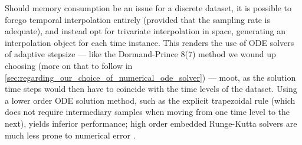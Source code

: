 Should memory consumption be an issue for a discrete dataset, it is possible
to forego temporal interpolation entirely (provided that the sampling rate
is adequate), and instead opt for trivariate interpolation in space, generating
an interpolation object for each time instance. This renders the use of
ODE solvers of adaptive stepsize --- like the Dormand-Prince 8(7) method we
wound up choosing (more on that to follow in
\cref{sec:regarding_our_choice_of_numerical_ode_solver}) --- moot, as the
solution time steps would then have to coincide with the time levels of the
dataset. Using a lower order ODE solution method, such as the explicit
trapezoidal rule (which does not require intermediary samples when moving from
one time level to the next), yields inferior performance; high order embedded
Runge-Kutta solvers are much less prone to numerical error
\parencite{loken2017sensitivity}.



